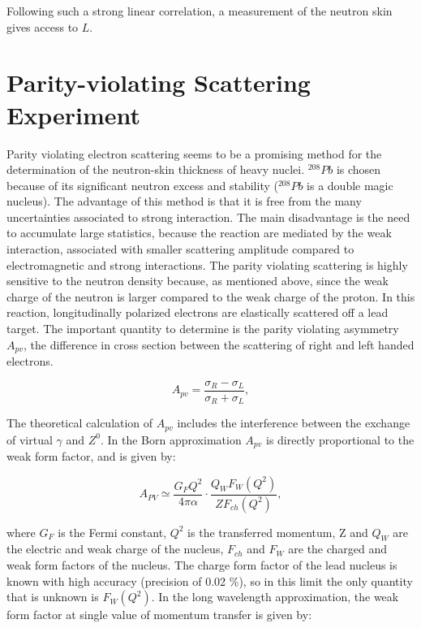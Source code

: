 Following such a strong linear correlation, a measurement of the neutron skin gives access to $L$. 
  
\section{Parity-violating Scattering Experiment}

Parity violating electron scattering seems to be a promising method for the determination of the neutron-skin thickness of heavy nuclei. $^{208}Pb$ is chosen because of its significant neutron excess and stability 
($^{208}Pb$ is a double magic nucleus). The advantage of this method is that it is free from the many uncertainties associated to strong interaction. The main disadvantage is the need to accumulate large statistics, because the reaction are mediated by the weak interaction, associated with smaller scattering amplitude compared to electromagnetic and strong interactions. 
The parity violating scattering is highly sensitive to the neutron density because, as mentioned above, since the weak charge of the neutron is larger compared to the weak charge of the proton.
In this reaction, longitudinally polarized electrons are elastically scattered off a lead target. The important quantity to determine is the parity violating asymmetry $A_{pv}$, the difference in cross section between the scattering of right and left handed electrons. 

\begin{equation}
A_{pv} = \dfrac{\sigma_{R} - \sigma_{L}}{\sigma_{R} + \sigma_{L}} ,
\end{equation} 

The theoretical calculation of $A_{pv}$ includes the interference between the exchange of virtual $\gamma$ and $Z^{0}$. In the Born approximation $A_{pv}$ is directly proportional to the weak form factor, and is given by:

\begin{equation} \label{eq:BornLimit}
A_{PV} \simeq \dfrac{G_{F} Q^{2}}{4 \pi \alpha} \cdot \dfrac{Q_{W} F_{W}(Q^{2})}{Z F_{ch}(Q^{2})} ,
\end{equation} 

where $G_{F}$ is the Fermi constant, $Q^{2}$ is the transferred momentum, Z and $Q_{W}$ are the electric and weak charge of the nucleus, $F_{ch}$ and $F_{W}$ are the charged and weak form factors of the nucleus. The charge form factor of the lead nucleus is known with high accuracy (precision of 0.02 \%), so in this limit the only quantity that is unknown is $F_{W}(Q^{2})$. In the long wavelength approximation, the weak form factor at single value of momentum transfer is given by:

